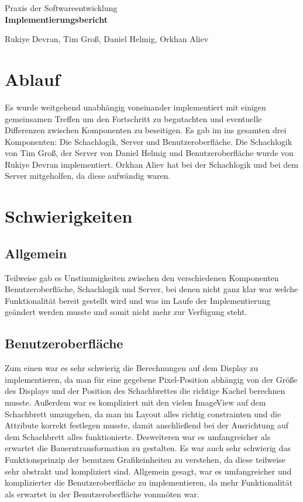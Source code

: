 \documentclass[parskip=full]{scrartcl}
\begin{document}
	\begin{titlepage}
		
		\centering
		\vspace*{0.2\textheight}
		{\Large Praxis der Softwareentwicklung}\\[\baselineskip]
		\vspace{2cm}
		{\Huge \textbf{Implementierungsbericht}}\\[\baselineskip]\par
		\vspace{2cm}
		{\LARGE Rukiye Devran, Tim Groß, Daniel Helmig, Orkhan Aliev}\par		
		\newpage	
		\tableofcontents
		\pagebreak
		
	\end{titlepage}
	\section{Ablauf}
	Es wurde weitgehend unabhängig voneinander implementiert mit einigen gemeinsamen Treffen um den Fortschritt zu begutachten und eventuelle Differenzen zwischen Komponenten zu beseitigen. 
Es gab im ins gesamten drei Komponenten: Die Schachlogik, Server und Benutzeroberfläche.
Die Schachlogik von Tim Groß, der Server von Daniel Helmig und Benutzeroberfläche wurde von Rukiye Devran implementiert. Orkhan Aliev hat bei der Schachlogik und bei dem Server mitgeholfen, da diese aufwändig waren.

	\section{Schwierigkeiten}
		\subsection{Allgemein} 
		Teilweise gab es Unstimmigkeiten zwischen den verschiedenen Komponenten Benutzeroberfläche, Schachlogik und Server, bei denen nicht ganz klar war welche Funktionalität bereit gestellt wird und was im Laufe der Implementierung geändert werden musste und somit nicht mehr zur Verfügung steht. 
		
		\subsection{Benutzeroberfläche}	Zum einen war es sehr schwierig die Berechnungen auf dem Display zu implementieren, da man für eine gegebene Pixel-Position abhängig von der Größe des Displays und der Position des Schachbrettes die richtige Kachel berechnen musste. 
Außerdem war es kompliziert mit den vielen ImageView auf dem Schachbrett umzugehen, da man im Layout alles richtig constrainten und die Attribute korrekt festlegen musste, damit anschließend bei der Ausrichtung auf dem Schachbrett alles funktionierte.
Desweiteren war es umfangreicher als erwartet die Bauerntransformation zu gestalten.
Es war auch sehr schwierig das Funktionsprinzip der benutzen Grafikeinheiten zu verstehen, da diese teilweise sehr abstrakt und kompliziert sind. 
Allgemein gesagt, war es umfangreicher und komplizierter die Benutzeroberfläche zu implementieren, da mehr Funktionalität als erwartet in der Benutzeroberfläche vonnnöten war. 
	
\end{document}
